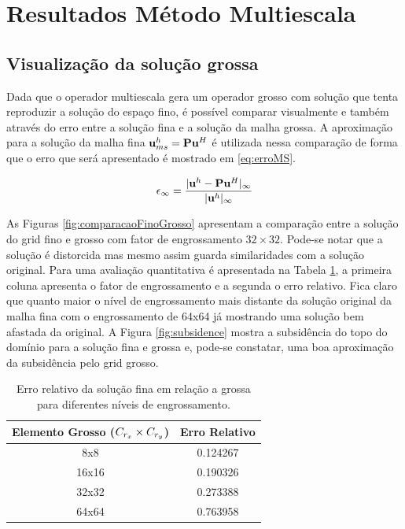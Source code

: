 \section{Resultados Método Multiescala}

\subsection{Visualização da solução grossa}

Dada que o operador multiescala gera um operador grosso com solução que tenta reproduzir a solução do espaço fino, é possível comparar visualmente e também através do erro entre a solução fina e a solução da malha grossa. A aproximação para a solução da malha fina $\mathbf{u}^h_{ms} = \mathbf{P} \mathbf{u}^H$ é utilizada nessa comparação de forma que o erro que será apresentado é mostrado em \eqref{eq:erroMS}.

\begin{equation}\label{eq:erroMS}
\epsilon_{\infty} =\frac{|\mathbf{u}^h - \mathbf{P} \mathbf{u}^H|_{\infty}}{|\mathbf{u}^h|_{\infty}}
\end{equation}


As Figuras \ref{fig:comparacaoFinoGrosso} apresentam a comparação entre a solução do grid fino e grosso com fator de engrossamento $32\times32$. Pode-se notar que a solução é distorcida mas mesmo assim guarda similaridades com a solução original. Para uma avaliação quantitativa é apresentada na Tabela \ref{table:erroRelativoEngrossamento}, a primeira coluna apresenta o fator de engrossamento e a segunda o erro relativo. Fica claro que quanto maior o nível de engrossamento mais distante da solução original da malha fina com o engrossamento de 64x64 já mostrando uma solução bem afastada da original. 
A Figura \ref{fig:subsidence} mostra a subsidência do topo do domínio para a solução fina e grossa e, pode-se constatar, uma boa aproximação da subsidência pelo grid grosso.


\begin{table}[]
\centering

\caption{Erro relativo da solução fina em relação a grossa para diferentes níveis de engrossamento.}
\label{table:erroRelativoEngrossamento}

\begin{tabular}{|c|c|}
\hline
\textbf{Elemento Grosso ($C_{r_x}\times C_{r_y}$)} & \textbf{Erro Relativo} \\ \hline
8x8                             & 0.124267               \\ \hline
16x16                           & 0.190326               \\ \hline
32x32                           & 0.273388               \\ \hline
64x64                           & 0.763958               \\ \hline
\end{tabular}
\end{table}


